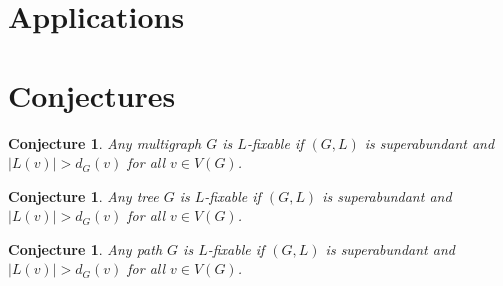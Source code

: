 \documentclass[12pt]{article}
\theoremstyle{plain}
\newtheorem{conjecture}[thm]{Conjecture}
\theoremstyle{definition}
\theoremstyle{remark}
\begin{document}
\section{Applications}

\section{Conjectures}
\begin{conjecture}
Any multigraph $G$ is $L$-fixable if $(G, L)$ is superabundant and $|L(v)| > d_G(v)$ for all $v \in V(G)$.
\end{conjecture}

\begin{conjecture}
Any tree $G$ is $L$-fixable if $(G, L)$ is superabundant and $|L(v)| > d_G(v)$ for all $v \in V(G)$.
\end{conjecture}

\begin{conjecture}
Any path $G$ is $L$-fixable if $(G, L)$ is superabundant and $|L(v)| > d_G(v)$ for all $v \in V(G)$.
\end{conjecture}



\end{document}
